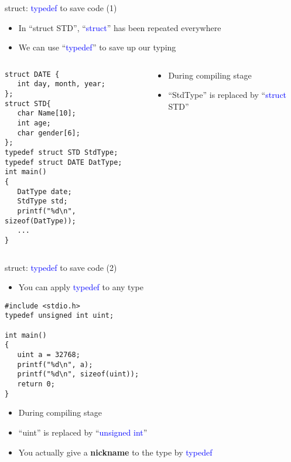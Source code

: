 \begin{frame}[fragile]{struct: \textcolor{blue}{typedef} to save code (1)}
\begin{itemize}
	\item {In ``struct STD'',  ``\textcolor{blue}{struct}'' has been repeated everywhere}
	\item {We can use ``\textcolor{blue}{typedef}'' to save up our typing}
\end{itemize}
\vspace{-0.15in}
\begin{columns}
\begin{column}{0.48\linewidth}
\begin{lstlisting}
struct DATE {
   int day, month, year;
};
struct STD{
   char Name[10];
   int age;
   char gender[6];
};
typedef struct STD StdType;
typedef struct DATE DatType;
int main()
{  
   DatType date;
   StdType std;
   printf("%d\n", sizeof(DatType));
   ...
}
\end{lstlisting}
\end{column}
\begin{column}{0.48\linewidth}
\begin{itemize}
	\item {During compiling stage}
	\item {``StdType'' is replaced by ``\textcolor{blue}{struct} STD''}
\end{itemize}
\end{column}
\end{columns}
\end{frame}

\begin{frame}[fragile]{struct: \textcolor{blue}{typedef} to save code (2)}
\begin{itemize}
	\item {You can apply \textcolor{blue}{typedef} to any type}
\end{itemize}
\vspace{-0.05in}
\begin{lstlisting}
#include <stdio.h>
typedef unsigned int uint;

int main()
{
   uint a = 32768;
   printf("%d\n", a);
   printf("%d\n", sizeof(uint));
   return 0;
}
\end{lstlisting}
\begin{itemize}
	\item {During compiling stage}
	\item {``uint'' is replaced by ``\textcolor{blue}{unsigned int}''}
	\item {You actually give a \textbf{nickname} to the type by \textcolor{blue}{typedef}}
\end{itemize}
\end{frame}


